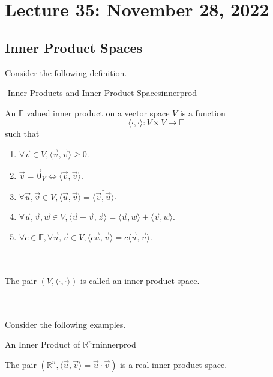 \section{Lecture 35: November 28, 2022}

    \subsection{Inner Product Spaces}
    \DOTHISLATER

        Consider the following definition.
        \begin{definition}{\Stop\,\,Inner Products and Inner Product Spaces}{innerprod}

            An \(\mathbb{F}\) valued inner product on a vector space \(V\) is a function 
            \begin{equation*}
                \langle\cdot,\cdot\rangle:V\times V\to \mathbb{F}
            \end{equation*}
            such that
            \begin{enumerate}
                \item \(\forall \vec{v}\in V,\langle \vec{v},\vec{v}\rangle\geq 0\).
                \item \(\vec{v}=\vec{0}_V\iff \langle \vec{v},\vec{v}\rangle\).
                \item \(\forall \vec{u},\vec{v}\in V, \langle \vec{u},\vec{v}\rangle=\bar{\langle \vec{v}, \vec{u}\rangle}\).
                \item \(\forall \vec{u},\vec{v},\vec{w}\in V, \langle \vec{u}+\vec{v}, \vec{z}\rangle=\langle \vec{u},\vec{w}\rangle+\langle \vec{v},\vec{w}\rangle\).
                \item \(\forall c\in\mathbb{F},\forall \vec{u},\vec{v}\in V, \langle c\vec{u},\vec{v}\rangle=c\langle \vec{u},\vec{v}\rangle\).
            \end{enumerate}
            \vphantom
            \\
            \\
            The pair \((V,\langle\cdot,\cdot\rangle)\) is called an inner product space.
            
        \end{definition}
        \vphantom
        \\
        \\
        Consider the following examples.
        \begin{example}{An Inner Product of \(\mathbb{R}^n\)}{rninnerprod}
            
            The pair \((\mathbb{R}^n, \langle \vec{u},\vec{v}\rangle=\vec{u}\cdot\vec{v})\) is a real inner product space.

        \end{example}
